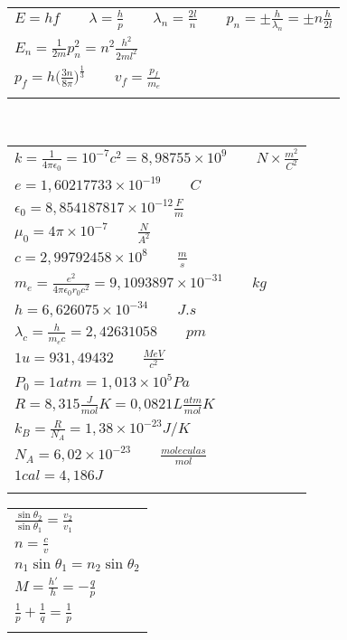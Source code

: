 \documentclass[a4paper]{article}
\begin{document}
\begin{tabular}{|l|}
\hline
$ E = hf \qquad \lambda = \frac{h}{p} \qquad \lambda_n = \frac{2l}{n} \qquad p_n = \pm \frac{h}{\lambda_n} = \pm n \frac{h}{2l} $ \\
$ E_n = \frac{1}{2m}p_n^2 = n^2 \frac{h^2}{2ml^2} $ \\
$ p_f = h\big( \frac{3n}{8\pi} \big)^{ \frac{1}{3} } \qquad v_f = \frac{p_f}{m_e} $ \\
\\
\hline
\end{tabular}
\\
\begin{tabular}{|l|}
\hline
$ k = \frac{1}{ 4 \pi \epsilon_0 } = 10^{-7} c^2 = 8,98755\times 10^9 \qquad N \times \frac{ m^2 }{ C^2 } $ \\
$ e = 1,602 177 33\times 10^{-19} \qquad C $\\
$ \epsilon_0 = 8,854 187 817 \times 10^{-12} \frac{F}{m} $ \\
$ \mu_0 = 4\pi \times 10^{-7} \qquad \frac{N}{A^2} $ \\
$ c = 2,997 924 58 \times 10^8 \qquad \frac{m}{s} $ \\
$ m_e = \frac{e^2}{4 \pi \epsilon_0 r_0 c^2 } = 9,109 389 7 \times 10^{-31} \qquad kg $ \\
$ h = 6,626 075 \times 10^{-34}\qquad J.s $ \\
$ \lambda_c = \frac{h}{m_e c} = 2,426 310 58 \qquad pm $ \\
$ 1 u = 931,494 32 \qquad \frac{MeV}{c^2} $ \\
$ P_0 = 1 atm = 1,013 \times 10^5 Pa $\\
$ R = 8,315 \frac{J}{mol}K = 0,0821 L\frac{atm}{mol}K $\\
$ k_B = \frac{R}{N_A} = 1,38 \times 10^{-23} J/K $\\
$ N_A = 6,02 \times 10^{-23} \qquad \frac{moleculas}{mol} $\\
$ 1 cal = 4,186 J $\\
\\
\hline
\end{tabular}
\begin{tabular}{|l|}
\hline
$ \frac {\sin \theta_2}{\sin \theta_1} = \frac {v_2}{v_1} $ \\
$ n = \frac{c}{v} $ \\
$ n_1 \sin \theta_1 = n_2 \sin \theta_2 $ \\
\hline
$ M = \frac{h'}{h} = - \frac{q}{p} $ \\
$ \frac{1}{p} + \frac{1}{q} = \frac{1}{p} $ \\
\\
\hline
\end{tabular}
\end{document}
